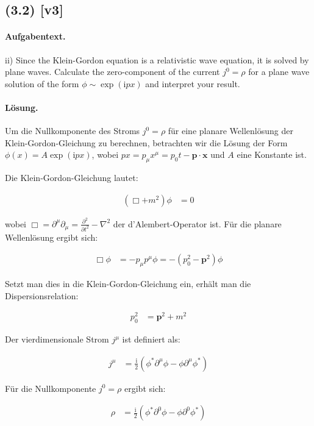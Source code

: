 \documentclass[11pt,a4paper]{article}
\begin{document}
\subsection*{(3.2) [v3]}
\paragraph{Aufgabentext.}
ii) Since the Klein-Gordon equation is a relativistic wave equation, it is solved by plane waves. Calculate the zero-component of the current $j^0=\rho$ for a plane wave solution of the form $\phi \sim \exp (\mathrm{i} p x)$ and interpret your result.

\paragraph{Lösung.}
Um die Nullkomponente des Stroms $j^0 = \rho$ für eine planare Wellenlösung der Klein-Gordon-Gleichung zu berechnen, betrachten wir die Lösung der Form $\phi(x) = A \exp(\mathrm{i} p x)$, wobei $p x = p_\mu x^\mu = p_0 t - \mathbf{p} \cdot \mathbf{x}$ und $A$ eine Konstante ist.

Die Klein-Gordon-Gleichung lautet:

\begin{align*}
(\Box + m^2) \phi &= 0
\end{align*}

wobei $\Box = \partial^\mu \partial_\mu = \frac{\partial^2}{\partial t^2} - \nabla^2$ der d'Alembert-Operator ist. Für die planare Wellenlösung ergibt sich:

\begin{align*}
\Box \phi &= -p_\mu p^\mu \phi = -(p_0^2 - \mathbf{p}^2) \phi
\end{align*}

Setzt man dies in die Klein-Gordon-Gleichung ein, erhält man die Dispersionsrelation:

\begin{align*}
p_0^2 &= \mathbf{p}^2 + m^2
\end{align*}

Der vierdimensionale Strom $j^\mu$ ist definiert als:

\begin{align*}
j^\mu &= \frac{\mathrm{i}}{2} \left( \phi^* \partial^\mu \phi - \phi \partial^\mu \phi^* \right)
\end{align*}

Für die Nullkomponente $j^0 = \rho$ ergibt sich:

\begin{align*}
\rho &= \frac{\mathrm{i}}{2} \left( \phi^* \partial^0 \phi - \phi \partial^0 \phi^* \right)
\end{align*}
\end{document}
